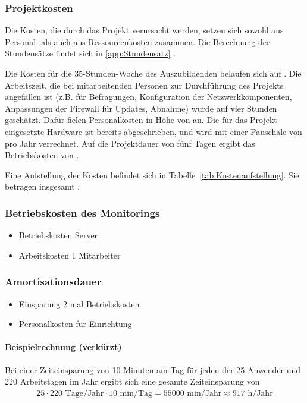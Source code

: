 \subsubsection{Projektkosten}
\label{sec:Projektkosten}
Die Kosten, die durch das Projekt verursacht werden, setzen sich sowohl aus Personal- als auch aus Ressourcenkosten zusammen. Die Berechnung der Stundensätze findet sich in \ref{app:Stundensatz} .

Die Kosten für die 35-Stunden-Woche des Auszubildenden belaufen sich auf . Die Arbeitszeit, die bei mitarbeitenden Personen zur Durchführung des Projekts angefallen ist (z.B. für Befragungen, Konfiguration der Netzwerkkomponenten, Anpassungen der Firewall für Updates, Abnahme) wurde auf vier Stunden geschätzt. Dafür fielen Personalkosten in Höhe von  an. Die für das Projekt eingesetzte Hardware ist bereits abgeschrieben, und wird mit einer Pauschale von  pro Jahr verrechnet. Auf die Projektdauer von fünf Tagen ergibt das Betriebskosten von .

Eine Aufstellung der Kosten befindet sich in Tabelle~\ref{tab:Kostenaufstellung}. Sie betragen insgesamt .

\subsubsection{Betriebskosten des Monitorings}
\label{sec:BetriebskostenMonitoring}
\begin{itemize}
	\item Betriebskosten Server
	\item Arbeitskosten 1 Mitarbeiter
\end{itemize}

\subsubsection{Amortisationsdauer}
\label{sec:Amortisationsdauer}
\begin{itemize}
	\item Einsparung 2 mal Betriebskosten
	\item Personalkosten für Einrichtung
\end{itemize}

\paragraph{Beispielrechnung (verkürzt)}
Bei einer Zeiteinsparung von 10 Minuten am Tag für jeden der 25 Anwender und 220 Arbeitstagen im Jahr ergibt sich eine gesamte Zeiteinsparung von 
\begin{eqnarray}
25 \cdot 220 \mbox{ Tage/Jahr} \cdot 10 \mbox{ min/Tag} = 55000 \mbox{ min/Jahr} \approx 917 \mbox{ h/Jahr} 
\end{eqnarray}

